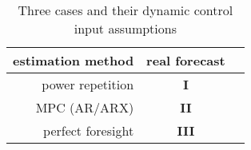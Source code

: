 \begin{table}[htb]\centering
	\begin{tabular}{r | c c}
		estimation method & real forecast\\%
		\hline
		power repetition & \textbf{I}\\%
		MPC (AR/ARX) & \textbf{II}\\%
		perfect foresight & \textbf{III}\\%
	\end{tabular}
	\caption{Three cases and their dynamic control input assumptions}
	\label{ch2:tab:cases}	
\end{table}